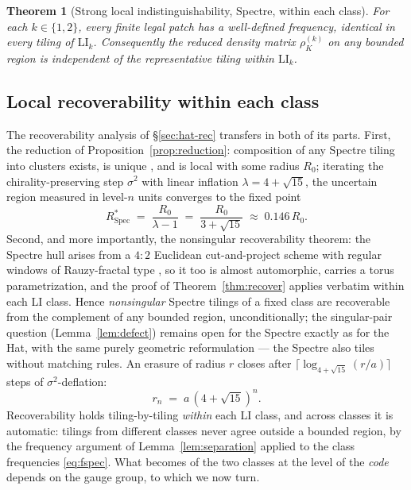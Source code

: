 \documentclass[a4paper,unpublished]{quantumarticle}
\newtheorem{theorem}{Theorem}
\theoremstyle{remark}
\newcommand{\rhoK}{\rho_{K}}
\newcommand{\LI}{\mathrm{LI}}
\begin{document}
\begin{theorem}[Strong local indistinguishability, Spectre, within each class]
\label{thm:LIspec}
For each $k \in \{1, 2\}$, every finite legal patch has a
well-defined frequency, identical in every tiling of $\LI_{k}$.
Consequently the reduced density matrix
$\rhoK^{(k)}$ on any bounded region is independent of the
representative tiling within $\LI_{k}$.
\end{theorem}

\subsection{Local recoverability within each class}
\label{sec:spec-rec}

The recoverability analysis of \S\ref{sec:hat-rec} transfers in both
of its parts. First, the reduction of
Proposition~\ref{prop:reduction}: composition of any Spectre tiling
into clusters exists, is unique \cite[Thm.~2.2]{Smith2024spectre},
and is local with some radius $R_{0}$; iterating the
chirality-preserving step $\sigma^{2}$ with linear inflation
$\lambda = 4+\sqrt{15}$, the uncertain region measured in level-$n$
units converges to the fixed point
\begin{equation}
R^{*}_{\mathrm{Spec}} \;=\; \frac{R_{0}}{\lambda - 1}
\;=\; \frac{R_{0}}{3 + \sqrt{15}} \;\approx\; 0.146\, R_{0} .
\label{eq:RstarSpec}
\end{equation}
Second, and more importantly, the nonsingular recoverability theorem:
the Spectre hull arises from a $4{:}2$ Euclidean cut-and-project
scheme with regular windows of Rauzy-fractal type \cite{BGMS2025},
so it too is almost automorphic, carries a torus parametrization,
and the proof of Theorem~\ref{thm:recover} applies verbatim within
each LI class. Hence \emph{nonsingular} Spectre tilings of a fixed
class are recoverable from the complement of any bounded region,
unconditionally; the singular-pair question
(Lemma~\ref{lem:defect}) remains open for the Spectre exactly as for
the Hat, with the same purely geometric reformulation --- the
Spectre also tiles without matching rules. An erasure of radius $r$
closes after $\lceil \log_{4+\sqrt{15}} (r/a) \rceil$ steps of
$\sigma^{2}$-deflation:
\begin{equation}
r_{n} \;=\; a\, (4+\sqrt{15})^{n} .
\label{eq:rspec}
\end{equation}
Recoverability holds tiling-by-tiling \emph{within} each LI class,
and across classes it is automatic: tilings from different classes
never agree outside a bounded region, by the frequency argument of
Lemma~\ref{lem:separation} applied to the class frequencies
\eqref{eq:fspec}. What becomes of the two classes at the level of
the \emph{code} depends on the gauge group, to which we now turn.
\end{document}
